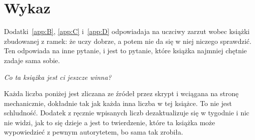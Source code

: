%
%
%
%
%
%
\chapter{Wykaz}
\label{app:F}

\noindent
Dodatki~\ref{app:B}, \ref{app:C} i~\ref{app:D} odpowiadaja na uczciwy zarzut
wobec książki zbudowanej z ramek: że uczy dobrze, a potem nie da się w niej
niczego sprawdzić. Ten odpowiada na inne pytanie, i jest to pytanie, które
książka najmniej chętnie zadaje sama sobie.

\emph{Co ta książka jest ci jeszcze winna?}

Każda liczba poniżej jest zliczana ze źródeł przez skrypt i wciągana na stronę
mechanicznie, dokładnie tak jak każda inna liczba w tej książce. To nie jest
schludność. Dodatek z ręcznie wpisanych liczb dezaktualizuje się w tygodnie i
nic nie widzi, jak to się dzieje \dash{} a jest to twierdzenie, które ta
książka może wypowiedzieć z pewnym autorytetem, bo sama tak zrobiła.

